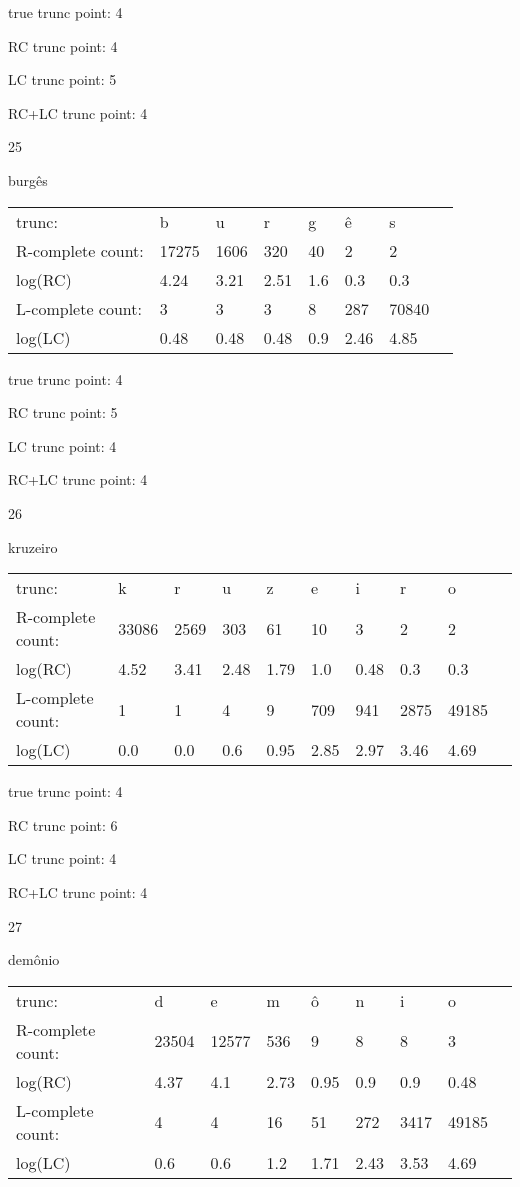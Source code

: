 \documentclass{article}
\begin{document}
true trunc point: 4

RC trunc point: 4

LC trunc point: 5

RC+LC trunc point: 4

\newpage

25

burgês

\begin{tabular}{l|lllllll}
trunc: & b & u & r & g & ê & s & \\ 
R-complete count: & 17275 & 1606 & 320 & 40 & 2 & 2 & \\ 
log(RC) & 4.24 & 3.21 & 2.51 & 1.6 & 0.3 & 0.3 & \\ 
L-complete count: & 3 & 3 & 3 & 8 & 287 & 70840 & \\ 
log(LC) & 0.48 & 0.48 & 0.48 & 0.9 & 2.46 & 4.85 & \\ 
\end{tabular}

true trunc point: 4

RC trunc point: 5

LC trunc point: 4

RC+LC trunc point: 4

\vspace{1em}

26

kruzeiro

\begin{tabular}{l|lllllllll}
trunc: & k & r & u & z & e & i & r & o & \\ 
R-complete count: & 33086 & 2569 & 303 & 61 & 10 & 3 & 2 & 2 & \\ 
log(RC) & 4.52 & 3.41 & 2.48 & 1.79 & 1.0 & 0.48 & 0.3 & 0.3 & \\ 
L-complete count: & 1 & 1 & 4 & 9 & 709 & 941 & 2875 & 49185 & \\ 
log(LC) & 0.0 & 0.0 & 0.6 & 0.95 & 2.85 & 2.97 & 3.46 & 4.69 & \\ 
\end{tabular}

true trunc point: 4

RC trunc point: 6

LC trunc point: 4

RC+LC trunc point: 4

\vspace{1em}

27

demônio

\begin{tabular}{l|llllllll}
trunc: & d & e & m & ô & n & i & o & \\ 
R-complete count: & 23504 & 12577 & 536 & 9 & 8 & 8 & 3 & \\ 
log(RC) & 4.37 & 4.1 & 2.73 & 0.95 & 0.9 & 0.9 & 0.48 & \\ 
L-complete count: & 4 & 4 & 16 & 51 & 272 & 3417 & 49185 & \\ 
log(LC) & 0.6 & 0.6 & 1.2 & 1.71 & 2.43 & 3.53 & 4.69 & \\ 
\end{tabular}
\end{document}
